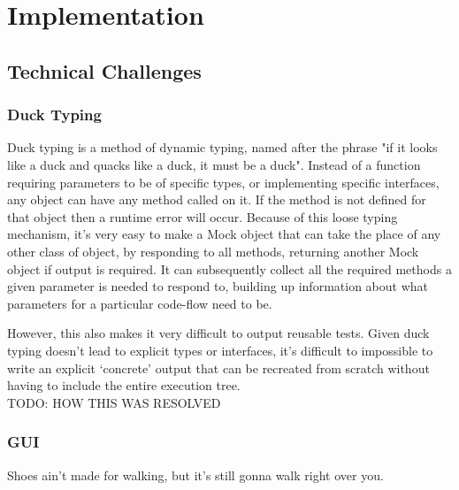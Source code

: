 \chapter{Implementation}
\section{Technical Challenges}
  \subsection{Duck Typing}
    Duck typing is a method of dynamic typing, named after the phrase "if it looks like a duck and quacks like a duck, it must be a duck".
    Instead of a function requiring parameters to be of specific types, or implementing specific interfaces, any object can have any method called on it.
    If the method is not defined for that object then a runtime error will occur.
    Because of this loose typing mechanism, it's very easy to make a Mock object that can take the place of any other class of object, by responding to all methods, returning another Mock object if output is required.
    It can subsequently collect all the required methods a given parameter is needed to respond to, building up information about what parameters for a particular code-flow need to be.

    However, this also makes it very difficult to output reusable tests.
    Given duck typing doesn't lead to explicit types or interfaces, it's difficult to impossible to write an explicit `concrete' output that can be recreated from scratch without having to include the entire execution tree.\\
    TODO: HOW THIS WAS RESOLVED \\

  \subsection{GUI}
    Shoes ain't made for walking, but it's still gonna walk right over you.
